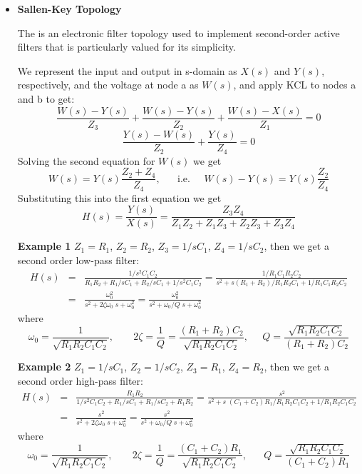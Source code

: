 \begin{itemize}
\item {\bf Sallen-Key Topology}

The 
 is an electronic filter topology used to implement second-order active filters that 
is particularly valued for its simplicity.


We represent the input and output in s-domain as $X(s)$ and $Y(s)$, respectively,
and the voltage at node a as $W(s)$, and apply KCL to nodes a and b to get:
\[ \frac{W(s)-Y(s)}{Z_3}+\frac{W(s)-Y(s)}{Z_2}+\frac{W(s)-X(s)}{Z_1}=0 \]
\[ \frac{Y(s)-W(s)}{Z_2}+\frac{Y(s)}{Z_4}=0 \]
Solving the second equation for $W(s)$ we get
\[ W(s)=Y(s)\frac{Z_2+Z_4}{Z_4},\;\;\;\;\;\;\mbox{i.e.}\;\;\;\;\;
W(s)-Y(s)=Y(s)\frac{Z_2}{Z_4} \]
Substituting this into the first equation we get
\[   H(s)=\frac{Y(s)}{X(s)}=\frac{Z_3Z_4}{Z_1Z_2+Z_1Z_3+Z_2Z_3+Z_3Z_4} \]

{\bf Example 1} 
$Z_1=R_1$, $Z_2=R_2$, $Z_3=1/sC_1$, $Z_4=1/sC_2$, then we get a second order 
low-pass filter:
\begin{eqnarray}
  H(s)&=&\frac{1/s^2C_1C_2}{R_1R_2+R_1/sC_1+R_2/sC_1+1/s^2C_1C_2}
  =\frac{1/R_1C_1R_2C_2}{s^2+s(R_1+R_2)/R_1R_2C_1+1/R_1C_1R_2C_2}
  \nonumber \\
  &=&\frac{\omega_0^2}{s^2+2\zeta\omega_0\;s+\omega_0^2} 
  =\frac{\omega_0^2}{s^2+\omega_0/Q \;s+\omega_0^2} 
  \nonumber
\end{eqnarray}
where
\[ \omega_0=\frac{1}{\sqrt{R_1R_2C_1C_2}},\;\;\;\;\;\;\;
  2\zeta=\frac{1}{Q}=\frac{(R_1+R_2)C_2}{\sqrt{R_1R_2C_1C_2}},\;\;\;\;\;
  Q=\frac{\sqrt{R_1R_2C_1C_2}}{(R_1+R_2)C_2} \]

{\bf Example 2} 
$Z_1=1/sC_1$, $Z_2=1/sC_2$, $Z_3=R_1$, $Z_4=R_2$, then we get a second order 
high-pass filter:
\begin{eqnarray}
  H(s)&=&\frac{R_1R_2}{1/s^2C_1C_2+R_1/sC_1+R_1/sC_2+R_1R_2}
  =\frac{s^2}{s^2+s\;(C_1+C_2)R_1/R_1R_2C_1C_2+1/R_1R_2C_1C_2}
  \nonumber \\
  &=&\frac{s^2}{s^2+2\zeta\omega_0\;s+\omega_0^2} 
  =\frac{s^2}{s^2+\omega_0/Q \;s+\omega_0^2} 
  \nonumber
\end{eqnarray}
where 
\[ \omega_0=\frac{1}{\sqrt{R_1R_2C_1C_2}},\;\;\;\;\;\;\;
  2\zeta=\frac{1}{Q}=\frac{(C_1+C_2)R_1}{\sqrt{R_1R_2C_1C_2}},\;\;\;\;\;\;
  Q=\frac{\sqrt{R_1R_2C_1C_2}}{(C_1+C_2)R_1} \]


\end{itemize}




	

	












